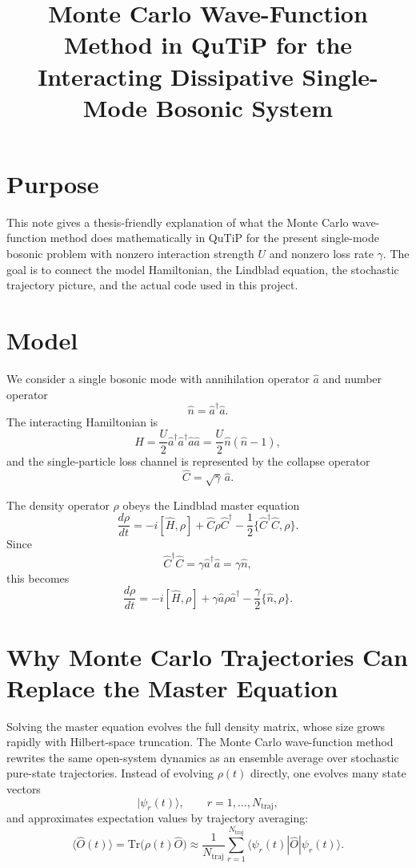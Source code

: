 \documentclass[12pt]{article}
\title{Monte Carlo Wave-Function Method in QuTiP for the Interacting Dissipative Single-Mode Bosonic System}
\author{}
\date{}
\begin{document}
\maketitle

\section*{Purpose}
This note gives a thesis-friendly explanation of what the Monte Carlo wave-function method does mathematically in QuTiP for the present single-mode bosonic problem with nonzero interaction strength $U$ and nonzero loss rate $\gamma$. The goal is to connect the model Hamiltonian, the Lindblad equation, the stochastic trajectory picture, and the actual code used in this project.

\section*{Model}
We consider a single bosonic mode with annihilation operator $\hat a$ and number operator
\[
\hat n = \hat a^\dagger \hat a.
\]
The interacting Hamiltonian is
\[
\hat H = \frac{U}{2}\hat a^\dagger \hat a^\dagger \hat a \hat a
= \frac{U}{2}\hat n(\hat n-1),
\]
and the single-particle loss channel is represented by the collapse operator
\[
\hat C = \sqrt{\gamma}\,\hat a.
\]

The density operator $\rho$ obeys the Lindblad master equation
\[
\frac{d\rho}{dt}
= -i[\hat H,\rho]
+ \hat C \rho \hat C^\dagger
- \frac12\{\hat C^\dagger \hat C,\rho\}.
\]
Since
\[
\hat C^\dagger \hat C = \gamma \hat a^\dagger \hat a = \gamma \hat n,
\]
this becomes
\[
\frac{d\rho}{dt}
= -i[\hat H,\rho]
+ \gamma \hat a \rho \hat a^\dagger
- \frac{\gamma}{2}\{\hat n,\rho\}.
\]

\section*{Why Monte Carlo Trajectories Can Replace the Master Equation}
Solving the master equation evolves the full density matrix, whose size grows rapidly with Hilbert-space truncation. The Monte Carlo wave-function method rewrites the same open-system dynamics as an ensemble average over stochastic pure-state trajectories. Instead of evolving $\rho(t)$ directly, one evolves many state vectors
\[
|\psi_r(t)\rangle,
\qquad r=1,\dots,N_{\mathrm{traj}},
\]
and approximates expectation values by trajectory averaging:
\[
\langle \hat O(t)\rangle
= \mathrm{Tr}\!\bigl(\rho(t)\hat O\bigr)
\approx \frac{1}{N_{\mathrm{traj}}}\sum_{r=1}^{N_{\mathrm{traj}}}
\langle \psi_r(t)|\hat O|\psi_r(t)\rangle.
\]
\end{document}
